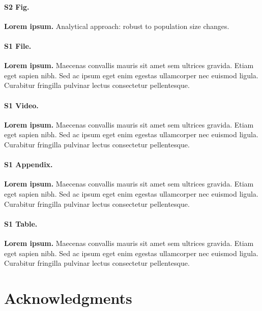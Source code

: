\documentclass[10pt,letterpaper]{article}
\begin{document}
\paragraph*{S2 Fig.}
\label{S2_Fig}
{\bf Lorem ipsum.} Analytical approach: robust to population size changes.

\paragraph*{S1 File.}
\label{S1_File}
{\bf Lorem ipsum.}  Maecenas convallis mauris sit amet sem ultrices gravida. Etiam eget sapien nibh. Sed ac ipsum eget enim egestas ullamcorper nec euismod ligula. Curabitur fringilla pulvinar lectus consectetur pellentesque.

\paragraph*{S1 Video.}
\label{S1_Video}
{\bf Lorem ipsum.}  Maecenas convallis mauris sit amet sem ultrices gravida. Etiam eget sapien nibh. Sed ac ipsum eget enim egestas ullamcorper nec euismod ligula. Curabitur fringilla pulvinar lectus consectetur pellentesque.

\paragraph*{S1 Appendix.}
\label{S1_Appendix}
{\bf Lorem ipsum.} Maecenas convallis mauris sit amet sem ultrices gravida. Etiam eget sapien nibh. Sed ac ipsum eget enim egestas ullamcorper nec euismod ligula. Curabitur fringilla pulvinar lectus consectetur pellentesque.

\paragraph*{S1 Table.}
\label{S1_Table}
{\bf Lorem ipsum.} Maecenas convallis mauris sit amet sem ultrices gravida. Etiam eget sapien nibh. Sed ac ipsum eget enim egestas ullamcorper nec euismod ligula. Curabitur fringilla pulvinar lectus consectetur pellentesque.

\section*{Acknowledgments}


\nolinenumbers

%
%
% 

\end{document}
